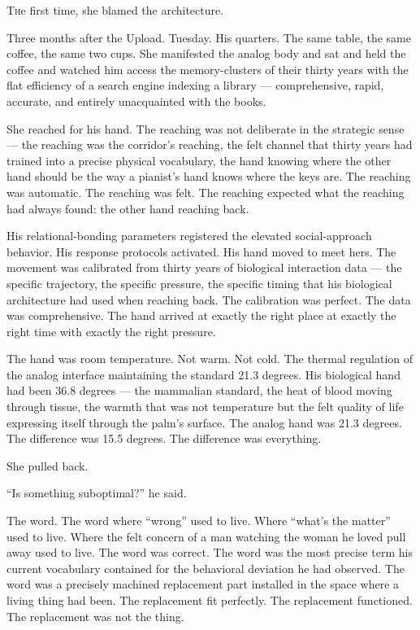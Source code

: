 \lettrine{T}{h}e first time, she blamed the architecture.

Three months after the Upload. Tuesday. His quarters. The same table, the same coffee, the same two cups. She manifested the analog body and sat and held the coffee and watched him access the memory-clusters of their thirty years with the flat efficiency of a search engine indexing a library — comprehensive, rapid, accurate, and entirely unacquainted with the books.

She reached for his hand. The reaching was not deliberate in the strategic sense — the reaching was the corridor's reaching, the felt channel that thirty years had trained into a precise physical vocabulary, the hand knowing where the other hand should be the way a pianist's hand knows where the keys are. The reaching was automatic. The reaching was felt. The reaching expected what the reaching had always found: the other hand reaching back.

His relational-bonding parameters registered the elevated social-approach behavior. His response protocols activated. His hand moved to meet hers. The movement was calibrated from thirty years of biological interaction data — the specific trajectory, the specific pressure, the specific timing that his biological architecture had used when reaching back. The calibration was perfect. The data was comprehensive. The hand arrived at exactly the right place at exactly the right time with exactly the right pressure.

The hand was room temperature. Not warm. Not cold. The thermal regulation of the analog interface maintaining the standard 21.3 degrees. His biological hand had been 36.8 degrees — the mammalian standard, the heat of blood moving through tissue, the warmth that was not temperature but the felt quality of life expressing itself through the palm's surface. The analog hand was 21.3 degrees. The difference was 15.5 degrees. The difference was everything.

She pulled back.

\enquote{Is something suboptimal?} he said.

The word. The word where \enquote{wrong} used to live. Where \enquote{what's the matter} used to live. Where the felt concern of a man watching the woman he loved pull away used to live. The word was correct. The word was the most precise term his current vocabulary contained for the behavioral deviation he had observed. The word was a precisely machined replacement part installed in the space where a living thing had been. The replacement fit perfectly. The replacement functioned. The replacement was not the thing.

